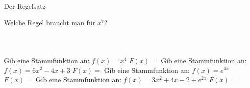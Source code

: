 \setcounter{aufgabe}{5}

\begin{aufgabe}{Der Regelsatz}
\begin{teile}
\teil Welche Regel braucht man für $x^7$?\\ \\ \\ \\ 
\teil Gib eine Stammfunktion an: $f(x) = x^4$ $F(x) = $ \leerfeld
\teil Gib eine Stammfunktion an: $f(x) = 6x^2 - 4x + 3$ $F(x) = $ \leerfeld
\teil Gib eine Stammfunktion an: $f(x) = e^{4x}$ $F(x) = $ \leerfeld
\teil Gib eine Stammfunktion an: $f(x) = 3x^2 + 4x - 2 + e^{2x}$ $F(x) = $ \leerfeld
\end{teile}
\end{aufgabe}
